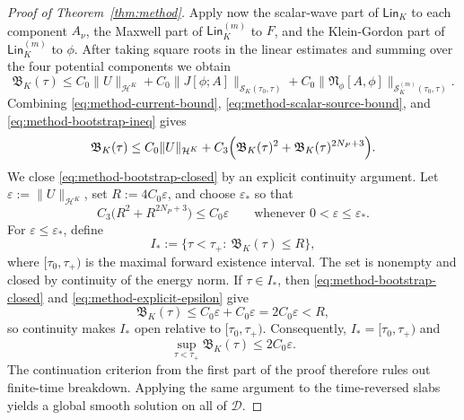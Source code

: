 \documentclass[11pt]{article}
\numberwithin{equation}{section}
\theoremstyle{plain}
\theoremstyle{definition}
\theoremstyle{remark}
\newcommand{\Lin}{\mathsf{Lin}}
\begin{document}
\begin{proof}[Proof of Theorem~\ref{thm:method}]
Apply now the scalar-wave part of $\Lin_{K}$ to each component $A_{\nu}$, the Maxwell part of $\Lin_{K}^{(m)}$ to $F$, and the Klein-Gordon part of $\Lin_{K}^{(m)}$ to $\phi$. After taking square roots in the linear estimates and summing over the four potential components we obtain
\begin{equation}\label{eq:method-bootstrap-ineq}
\mathfrak B_{K}(\tau)
\le
C_{0}\|U\|_{\mathcal H^{K}}
+
C_{0}\|J[\phi;A]\|_{\mathcal S_{K}(\tau_{0},\tau)}
+
C_{0}\|\mathfrak N_{\phi}[A,\phi]\|_{\mathcal S_{K}^{(m)}(\tau_{0},\tau)}.
\end{equation}
Combining \eqref{eq:method-current-bound}, \eqref{eq:method-scalar-source-bound}, and \eqref{eq:method-bootstrap-ineq} gives
\begin{equation}\label{eq:method-bootstrap-closed}
\mathfrak B_{K}(\tau)
\le
C_{0}\|U\|_{\mathcal H^{K}}
+
C_{3}\Bigl(\mathfrak B_{K}(\tau)^{2}+\mathfrak B_{K}(\tau)^{2N_{P}+3}\Bigr).
\end{equation}
We close \eqref{eq:method-bootstrap-closed} by an explicit continuity argument.  Let \(\varepsilon:=\|U\|_{\mathcal H^K}\), set \(R:=4C_0\varepsilon\), and choose \(\varepsilon_*\) so that
\begin{equation}\label{eq:method-explicit-epsilon}
 C_3\bigl(R^2+R^{2N_P+3}\bigr)\le C_0\varepsilon
 \qquad\text{whenever }0<\varepsilon\le\varepsilon_*.
\end{equation}
For \(\varepsilon\le\varepsilon_*\), define
\begin{equation}
 I_*:=\{\tau<\tau_+:\ \mathfrak B_K(\tau)\le R\},
\end{equation}
where \([\tau_0,\tau_+)\) is the maximal forward existence interval.  The set is nonempty and closed by continuity of the energy norm.  If \(\tau\in I_*\), then \eqref{eq:method-bootstrap-closed} and \eqref{eq:method-explicit-epsilon} give
\begin{equation}
 \mathfrak B_K(\tau)\le C_0\varepsilon+C_0\varepsilon=2C_0\varepsilon<R,
\end{equation}
so continuity makes \(I_*\) open relative to \([\tau_0,\tau_+)\).  Consequently, \(I_*=[\tau_0,\tau_+)\) and
\begin{equation}\label{eq:method-global-bootstrap-bound}
 \sup_{\tau<\tau_+}\mathfrak B_K(\tau)\le 2C_0\varepsilon.
\end{equation}
The continuation criterion from the first part of the proof therefore rules out finite-time breakdown. Applying the same argument to the time-reversed slabs yields a global smooth solution on all of \(\mathcal D\).


\end{proof}
\end{document}
